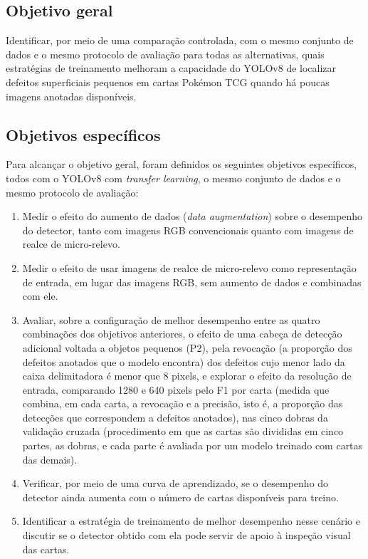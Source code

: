 \documentclass[
    12pt,                %
    openright,           %
    oneside,             %
    a4paper,             %
    english,             %
    brazil               %
]{abntex2}
\begin{document}
\subsection{Objetivo geral}

Identificar, por meio de uma comparação controlada, com o mesmo conjunto de dados e o mesmo protocolo de avaliação para todas as alternativas, quais estratégias de treinamento melhoram a capacidade do YOLOv8 de localizar defeitos superficiais pequenos em cartas Pokémon TCG quando há poucas imagens anotadas disponíveis.

\subsection{Objetivos específicos}

Para alcançar o objetivo geral, foram definidos os seguintes objetivos específicos, todos com o YOLOv8 com \textit{transfer learning}, o mesmo conjunto de dados e o mesmo protocolo de avaliação:

\begin{enumerate}
    \item Medir o efeito do aumento de dados (\textit{data augmentation})
    sobre o desempenho do detector, tanto com imagens RGB convencionais
    quanto com imagens de realce de micro-relevo.

    \item Medir o efeito de usar imagens de realce de micro-relevo como
    representação de entrada, em lugar das imagens RGB, sem aumento de
    dados e combinadas com ele.

        \item Avaliar, sobre a configuração de melhor desempenho entre as
    quatro combinações dos objetivos anteriores, o efeito de uma cabeça de
    detecção adicional voltada a objetos pequenos (P2), pela revocação (a
    proporção dos defeitos anotados que o modelo encontra) dos defeitos
    cujo menor lado da caixa delimitadora é menor que 8 pixels, e explorar
    o efeito da resolução de entrada, comparando 1280 e 640 pixels pelo F1
    por carta (medida que combina, em cada carta, a revocação e a
    precisão, isto é, a proporção das detecções que correspondem a
    defeitos anotados), nas cinco dobras da validação cruzada
    (procedimento em que as cartas são divididas em cinco partes, as
    dobras, e cada parte é avaliada por um modelo treinado com cartas das
    demais).

    \item Verificar, por meio de uma curva de aprendizado, se o desempenho
    do detector ainda aumenta com o número de cartas disponíveis para
    treino.

    \item Identificar a estratégia de treinamento de melhor desempenho
    nesse cenário e discutir se o detector obtido com ela pode servir de
    apoio à inspeção visual das cartas.
\end{enumerate}
\end{document}
